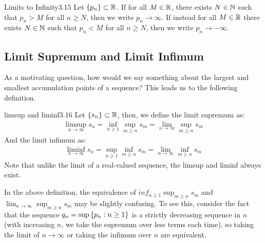 \begin{definition}{Limits to Infinity}{3.15}
    Let $\set{p_n} \subset \mathbb{R}$. If for all $M \in \mathbb{R}$, there exists $N \in \mathbb{N}$ such that $p_n > M$ for all $n \geq N$, then we write $p_n \rightarrow \infty$. If instead for all $M \in \mathbb{R}$ there exists $N \in \mathbb{N}$ such that $p_n < M$ for all $n \geq N$, then we write $p_n \rightarrow -\infty$.
\end{definition}



\subsection{Limit Supremum and Limit Infimum}
As a motivating question, how would we say something about the largest and smallest accumulation points of a sequence? This leads us to the following definition.
\begin{definition}{limsup and liminf}{3.16}
    Let $\set{s_n} \subset \mathbb{R}$, then, we define the limit supremum as:
    \begin{align*}
        \limsup_{n \rightarrow \infty} s_n = \inf_{n \geq 1}\sup_{m \geq n} s_m = \lim_{n \rightarrow \infty} \sup_{m \geq n} s_m
    \end{align*}
    And the limit infimum as:
    \begin{align*}
        \liminf_{n \rightarrow \infty} s_n = \sup_{n \geq 1}\inf_{m \geq n} s_m = \lim_{n \rightarrow \infty} \inf_{m \geq n} s_m
    \end{align*}
    Note that unlike the limit of a real-valued sequence, the limsup and liminf always exist.
\end{definition}

\noindent In the above definition, the equivalence of $inf_{n \geq 1}\sup_{m \geq n} s_m$ and $\lim_{n \rightarrow \infty} \sup_{m \geq n} s_m$ may be slightly confusing. To see this, consider the fact that the sequence $q_n = \sup \set{p_n: n \geq 1}$ is a strictly decreasing sequence in $n$ (with increasing $n$, we take the supremum over less terms each time), so taking the limit of $n \rightarrow \infty$ or taking the infimum over $n$ are equivalent. 

